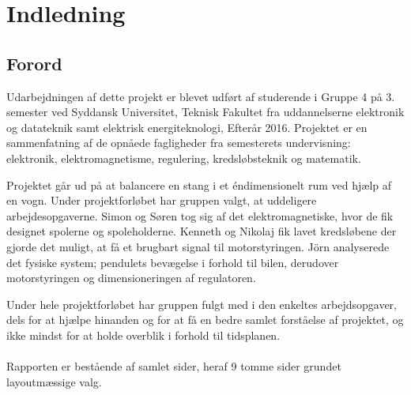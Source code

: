 \chapter{Indledning}

\section{Forord}\label{sec:forord}
Udarbejdningen af dette projekt er blevet udført af studerende i Gruppe 4 på 3. semester ved Syddansk Universitet, Teknisk Fakultet fra uddannelserne elektronik og datateknik samt elektrisk energiteknologi, Efterår 2016.
Projektet er en sammenfatning af de opnåede fagligheder fra semesterets undervisning: elektronik, elektromagnetisme, regulering, kredsløbsteknik og matematik.

Projektet går ud på at balancere en stang i et éndimensionelt rum ved hjælp af en vogn. Under projektforløbet har gruppen valgt, at uddeligere arbejdesopgaverne. Simon og Søren tog sig af det elektromagnetiske, hvor de fik designet spolerne og spoleholderne. Kenneth og Nikolaj fik lavet kredsløbene der gjorde det muligt, at få et brugbart signal til motorstyringen. Jörn analyserede det fysiske system; pendulets bevægelse i forhold til bilen, derudover motorstyringen og dimensioneringen af regulatoren.

Under hele projektforløbet har gruppen fulgt med i den enkeltes arbejdsopgaver, dels for at hjælpe hinanden og for at få en bedre samlet forståelse af projektet, og ikke mindst for at holde overblik i forhold til tidsplanen. 
\\ \\
Rapporten er bestående af samlet \pageref{LastPage} sider, heraf  9 tomme sider grundet layoutmæssige valg. 